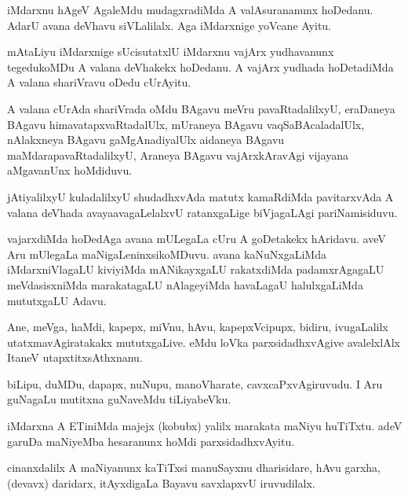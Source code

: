 \documentclass{article}
\begin{document}
\begin{mn}%
iMdarxnu hAgeV AgaleMdu mudagxradiMda A valAsurananunx hoDedanu. AdarU avana deVhavu 
siVLalilalx. Aga iMdarxnige yoVcane Ayitu.
\end{mn}

\begin{mn}%
mAtaLiyu iMdarxnige sUcisutatxlU iMdarxnu vajArx yudhavanunx tegedukoMDu A valana deVhakekx 
hoDedanu. A vajArx yudhada hoDetadiMda A valana shariVravu oDedu cUrAyitu.
\end{mn}

\begin{mn}%
A valana cUrAda shariVrada oMdu BAgavu meVru pavaRtadalilxyU, eraDaneya BAgavu 
himavatapxvaRtadalUlx, mUraneya BAgavu vaqSaBAcaladalUlx, nAlakxneya BAgavu gaMgAnadiyalUlx 
aidaneya BAgavu maMdarapavaRtadalilxyU, Araneya BAgavu vajArxkAravAgi vijayana aMgavanUnx 
hoMdiduvu.
\end{mn}

\begin{mn}%
jAtiyalilxyU kuladalilxyU shudadhxvAda matutx kamaRdiMda pavitarxvAda A valana deVhada 
avayaavagaLelalxvU ratanxgaLige biVjagaLAgi pariNamisiduvu.
\end{mn}

\begin{mn}%
vajarxdiMda hoDedAga avana mULegaLa cUru A goDetakekx hAridavu. aveV Aru mUlegaLa 
maNigaLeninxsikoMDuvu. avana kaNuNxgaLiMda iMdarxniVlagaLU kiviyiMda mANikayxgaLU 
rakatxdiMda padamxrAgagaLU meVdasisxniMda marakatagaLU nAlageyiMda havaLagaU halulxgaLiMda 
mututxgaLU Adavu. 
\end{mn}

\begin{mn}%
Ane, meVga, haMdi, kapepx, miVnu, hAvu, kapepxVcipupx, bidiru, ivugaLalilx 
utatxmavAgiratakakx mututxgaLive. eMdu loVka parxsidadhxvAgive avalelxlAlx ItaneV 
utapxtitxsAthxnanu.
\end{mn}

\begin{mn}%
biLipu, duMDu, dapapx, nuNupu, manoVharate, cavxcaPxvAgiruvudu. I Aru guNagaLu mutitxna 
guNaveMdu tiLiyabeVku.
\end{mn}

\begin{mn}%
iMdarxna A ETiniMda majejx (kobubx) yalilx marakata maNiyu huTiTxtu. adeV garuDa maNiyeMba 
hesaranunx hoMdi parxsidadhxvAyitu.
\end{mn}

\begin{mn}%
cinanxdalilx A maNiyanunx kaTiTxsi manuSayxnu dharisidare, hAvu garxha, (devavx) daridarx, 
itAyxdigaLa Bayavu savxlapxvU iruvudilalx.
\end{mn}
\end{document}
